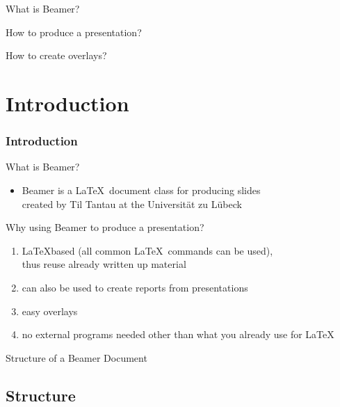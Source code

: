 \documentclass[c,8pt,xcolor...,x11names]{beamer}
\begin{document}
 
	\begin{frame}
	\customtitle
	\begin{list2}
		\item What is {\sc Beamer}?
		\item How to produce a presentation?
		\item How to create overlays?
	\end{list2}
\end{frame}


\section{Introduction} %


\begin{frame}
\frametitle{Introduction}

{\color{blue}What is {\sc Beamer}?}
\begin{itemize}
	\item 
	{\sc Beamer} is a \LaTeX\ document class for producing slides
	\\
	created by Til Tantau at the Universit\"at zu L\"ubeck    
\end{itemize}
{\color{blue}Why using {\sc Beamer} to produce a presentation?}
\begin{enumerate}
	\item \LaTeX  based (all common \LaTeX\ commands can be used), \\
	thus reuse already written up material
	\item can also be used to create reports from
	presentations
	\item  easy overlays
	\item no external programs needed other than what you already use for \LaTeX
\end{enumerate}

\end{frame}


\begin{frame}
\vfill
\begin{LARGE}
\hfill Structure of a {\sc Beamer} Document \hfill 
\end{LARGE}
\vfill
\end{frame}

\subsection{Structure}
\end{document}
